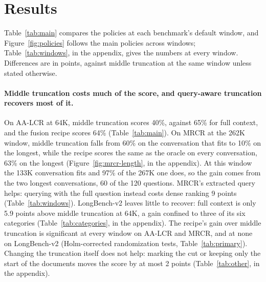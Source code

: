 \documentclass[letterpaper]{article} %
\newcommand{\recipe}{fusion recipe}
\begin{document}
\section{Results}
Table~\ref{tab:main} compares the policies at each benchmark's default window, and Figure~\ref{fig:policies} follows the main policies across windows; Table~\ref{tab:windows}, in the appendix, gives the numbers at every window. Differences are in points, against middle truncation at the same window unless stated otherwise.

\paragraph{Middle truncation costs much of the score, and query-aware truncation recovers most of it.} On AA-LCR at 64K, middle truncation scores 40\%, against 65\% for full context, and the \recipe{} scores 64\% (Table~\ref{tab:main}). On MRCR at the 262K window, middle truncation falls from 60\% on the conversation that fits to 10\% on the longest, while the recipe scores the same as the oracle on every conversation, 63\% on the longest (Figure~\ref{fig:mrcr-length}, in the appendix). At this window the 133K conversation fits and 97\% of the 267K one does, so the gain comes from the two longest conversations, 60 of the 120 questions. MRCR's extracted query helps: querying with the full question instead costs dense ranking 9 points (Table~\ref{tab:windows}). LongBench-v2 leaves little to recover: full context is only 5.9 points above middle truncation at 64K, a gain confined to three of its six categories (Table~\ref{tab:categories}, in the appendix). The recipe's gain over middle truncation is significant at every window on AA-LCR and MRCR, and at none on LongBench-v2 (Holm-corrected randomization tests, Table~\ref{tab:primary}). Changing the truncation itself does not help: marking the cut or keeping only the start of the documents moves the score by at most 2 points (Table~\ref{tab:other}, in the appendix).
\end{document}
